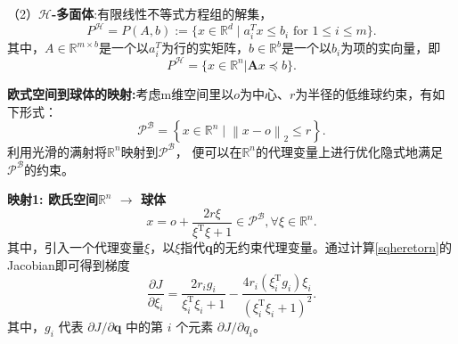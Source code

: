 （2）\textbf{$\mathcal{H}$-多面体}:有限线性不等式方程组的解集，
\begin{equation}
    P^\mathcal{H}=P(A,b) := \big\{x\in\mathbb{R}^d\mid a_i^Tx\leq b_i\text{ for }1\leq i\leq m\big\}.
\end{equation}
其中，$A\in\mathbb{R}^{m \times b} $是一个以$a_i^T$为行的实矩阵，$b\in\mathbb{R}^b $是一个以$b_i$为项的实向量，即
\begin{equation}\label{polytope}
    P^\mathcal{H}= \{x\in \mathbb{R}^n| \mathbf{A}x\preceq b\}  .
\end{equation}
\begin{tcolorbox}[green]
    \textbf{欧式空间到球体的映射:}考虑m维空间里以$o$为中心、$r$为半径的低维球约束，有如下形式：
    \begin{equation}
        \mathcal{P}^{\mathcal{B}}=\left\{x\in\mathbb{R}^n\mid\left\|x-o\right\|_2\leq r\right\}.
    \end{equation}
    利用光滑的满射将$\mathbb{R}^n$映射到$\mathcal{P}^{\mathcal{B}}$，
    便可以在$\mathbb{R}^n$的代理变量上进行优化隐式地满足$\mathcal{P}^{\mathcal{B}}$的约束。
\end{tcolorbox}
\begin{tcolorbox}[red]
    \textbf{映射1: 欧氏空间$\mathbb{R}^n$ $\rightarrow $ 球体}
    \begin{equation}\label{sqheretorn}
        x=o+\frac{2r\xi }{\xi^\mathrm{T}\xi+1}\in\mathcal{P}^\mathcal{B}, \forall \xi\in\mathbb{R}^n.
    \end{equation}
    其中，引入一个代理变量$\xi$，以$\xi$指代\textbf{q}的无约束代理变量。通过计算\eqref{sqheretorn}的Jacobian即可得到梯度
    \begin{equation}
        \frac{\partial J}{\partial\xi_i}=\frac{2r_ig_i}{\xi_i^\mathrm{T}\xi_i+1}-\frac{4r_i(\xi_i^\mathrm{T}g_i)\xi_i}{(\xi_i^\mathrm{T}\xi_i+1)^2}.
    \end{equation}
    其中，$g_i\text{ 代表 }\partial J/\partial\mathbf{q}\text{ 中的第 }i\text{ 个元素 }\partial J/\partial q_i$。
\end{tcolorbox}

